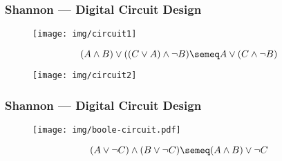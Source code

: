 \documentclass[UTF8,11pt,colorlinks,compress,openany]{beamer}%
\begin{document}
\begin{frame}\frametitle{Shannon --- Digital Circuit Design}
	\begin{figure}[!htbp]
		\begin{center}
			\texttt{[image: img/circuit1]}
		\end{center}
	\end{figure}
	\[(A\wedge B)\vee((C\vee A)\wedge\neg B)\semeq A\vee(C\wedge\neg B)\]
	\begin{figure}[!htbp]
		\begin{center}
			\texttt{[image: img/circuit2]}
		\end{center}
	\end{figure}
\end{frame}

\begin{frame}\frametitle{Shannon --- Digital Circuit Design}
\begin{figure}
\texttt{[image: img/boole-circuit.pdf]}
\end{figure}
\[(A\vee\neg C)\wedge(B\vee\neg C)\semeq(A\wedge B)\vee\neg C\]
\end{frame}
\end{document}
